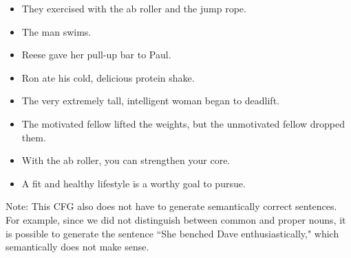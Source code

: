 \documentclass{article}
\begin{document}
\begin{tcolorbox}[enhanced,interior style={top color=Dandelion!20,bottom color=Dandelion!30}]
\begin{itemize}
\begin{itemize}
                \item They exercised with the ab roller and the jump rope.
                \item The man swims.
                \item Reese gave her pull-up bar to Paul.
                \item Ron ate his cold, delicious protein shake.
                \item The very extremely tall, intelligent woman began to deadlift.
                \item The motivated fellow lifted the weights, but the unmotivated fellow dropped them.
                \item With the ab roller, you can strengthen your core.
                \item A fit and healthy lifestyle is a worthy goal to pursue.
            \end{itemize}

            Note: This CFG also does not have to generate semantically correct sentences. For example, since we did not distinguish between common and proper nouns, it is possible to generate the sentence ``She benched Dave enthusiastically," which semantically does not make sense.
        \end{itemize}
\end{tcolorbox}




\end{document}
